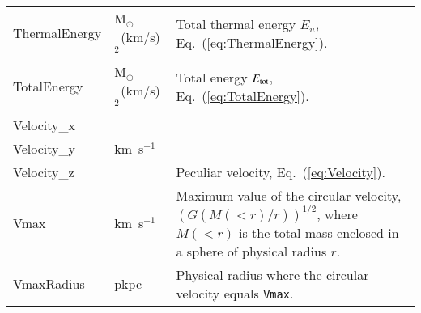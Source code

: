 \begin{table*}
\begin{center}
\begin{tabular}{ >{\ttfamily}p{4cm}p{1.5cm}p{11cm}}
ThermalEnergy &
M$_\odot$~(km/s)$^{2}$ &
Total thermal energy $E_u$, Eq.~(\ref{eq:ThermalEnergy}).\\

TotalEnergy &
M$_\odot$~(km/s)$^{2}$ & 
Total energy $E_{\rm tot}$, Eq.~(\ref{eq:TotalEnergy}).\\

Velocity\_x & & \\
Velocity\_y & km~s$^{-1}$ & \\
Velocity\_z & & \multirow{-3}{11cm}{Peculiar velocity, Eq.~(\ref{eq:Velocity}).}\\

Vmax &
km~s$^{-1}$ & Maximum value of the circular velocity, $(G(M(<r)/r))^{1/2}$, where $M(<r)$ is the total mass enclosed in a sphere of physical radius $r$.\\

VmaxRadius &
pkpc &
Physical radius where the circular velocity equals \texttt{Vmax}.\\

\hline

\end{tabular}
\end{center}
\end{table*}

